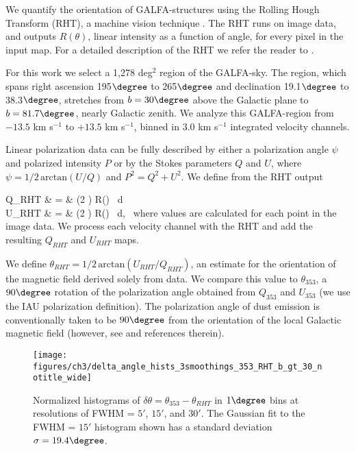 We quantify the orientation of GALFA-\hi structures using the Rolling Hough Transform (RHT), a machine vision technique \cite{Clark:2014it}. The RHT runs on image data, and outputs $R\left(\theta\right)$, linear intensity as a function of angle, for every pixel in the input map. For a detailed description of the RHT we refer the reader to \cite{Clark:2014it}.

For this work we select a 1,278 deg$^2$ region of the GALFA-\hi sky. The region, which spans right ascension 195$\degree$ to 265$\degree$ and declination 19.1$\degree$ to 38.3$\degree$, stretches from $b = 30\degree$ above the Galactic plane to $b =  81.7\degree$, nearly Galactic zenith. We analyze this GALFA-\hi region from $-13.5$ km s$^{-1}$ to $+13.5$ km s$^{-1}$, binned in $3.0$ km s$^{-1}$ integrated velocity channels. 

Linear polarization data can be fully described by either a polarization angle $\psi$ and polarized intensity $P$ or by the Stokes parameters $Q$ and $U$, where $\psi = 1/2 \, \mathrm{arctan} (U/Q)$ and $P^2 = Q^2 + U^2$. We define from the RHT output 

\bea
Q_{RHT} & = & \int {} \left(2 \theta \right) \cdot R\left(\theta \right) \, d\theta \,  \nonumber \\
U_{RHT} & = & \int {} \left(2 \theta \right) \cdot R\left(\theta \right) \, d\theta, \,
\eea
where values are calculated for each point in the image data. We process each velocity channel with the RHT and add the resulting $Q_{RHT}$ and $U_{RHT}$ maps. 

We define $\theta_{RHT} = 1/2 \, \mathrm{arctan} (U_{RHT}/Q_{RHT})$, an estimate for the orientation of the magnetic field derived solely from \hi data. We compare this value to $\theta_{353}$, a $90\degree$ rotation of the polarization angle obtained from $Q_{353}$ and $U_{353}$ (we use the IAU polarization definition). The polarization angle of dust emission is conventionally taken to be $90\degree$ from the orientation of the local Galactic magnetic field (however, see \cite{Lazarian:2007do} and references therein).

\begin{figure}
\centering
\texttt{[image: figures/ch3/delta\_angle\_hists\_3smoothings\_353\_RHT\_b\_gt\_30\_notitle\_wide]}
\caption{Normalized histograms of $\delta \theta = \theta_{353} - \theta_{RHT}$ in $1\degree$ bins at resolutions of FWHM = $5'$, $15'$, and $30'$. The Gaussian fit to the FWHM = $15'$ histogram shown has a standard deviation $\sigma = 19.4\degree$. 
\label{smoothhists}}
\end{figure}

